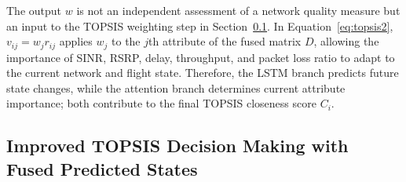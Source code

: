 \documentclass[remotesensing,article,submit,moreauthors]{Definitions/mdpi}
\begin{document}
The output $w$ is not an independent assessment of a network quality measure but an input to the TOPSIS weighting step in Section~\ref{sec:topsis}. In Equation~\eqref{eq:topsis2}, $v_{ij}=w_jr_{ij}$ applies $w_j$ to the $j$th attribute of the fused matrix $D$, allowing the importance of SINR, RSRP, delay, throughput, and packet loss ratio to adapt to the current network and flight state. Therefore, the LSTM branch predicts future state changes, while the attention branch determines current attribute importance; both contribute to the final TOPSIS closeness score $C_i$.

\subsection{Improved TOPSIS Decision Making with Fused Predicted States}\label{sec:topsis}
\end{document}
